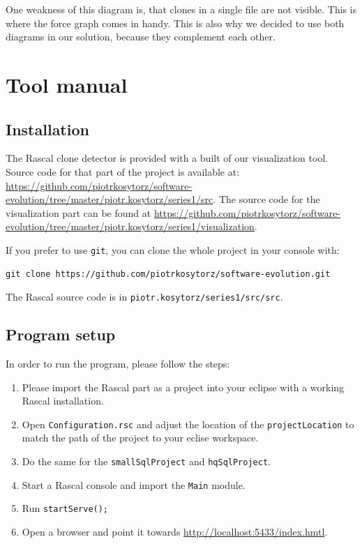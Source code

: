 \documentclass{uva-inf-article}
\begin{document}
One weakness of this diagram is, that clones in a single file are not visible. This is where the force graph comes in handy. This is also why we decided to use both diagrams in our solution, because they complement each other.

\section{Tool manual}

\subsection{Installation}

The Rascal clone detector is provided with a built of our visualization tool. Source code for that part of the project is available at: \url{https://github.com/piotrkosytorz/software-evolution/tree/master/piotr.kosytorz/series1/src}. The source code for the visualization part can be found at \url{https://github.com/piotrkosytorz/software-evolution/tree/master/piotr.kosytorz/series1/visualization}.

If you prefer to use \texttt{git}, you can clone the whole project in your console with:

\begin{verbatim}
git clone https://github.com/piotrkosytorz/software-evolution.git
\end{verbatim}

The Rascal source code is in \texttt{piotr.kosytorz/series1/src/src}.

\subsection{Program setup}

In order to run the program, please follow the steps:

\begin{enumerate}
\item Please import the Rascal part as a project into your eclipse with a working Rascal installation.
\item
  Open \texttt{Configuration.rsc} and adjust the location of the \texttt{projectLocation} to match the path of the project to your eclise workspace.
\item Do the same for the \texttt{smallSqlProject} and \texttt{hqSqlProject}.
\item Start a Rascal console and import the \texttt{Main} module.
\item Run \texttt{startServe();}
\item Open a browser and point it towards \url{http://localhost:5433/index.hmtl}.
\end{enumerate}
\end{document}
